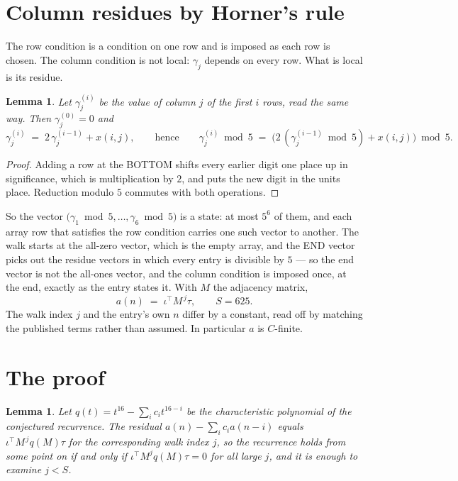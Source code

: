 \documentclass[11pt,a4paper]{article}
\theoremstyle{plain}
\newtheorem{lemma}[theorem]{Lemma}
\theoremstyle{definition}
\begin{document}
\section{Column residues by Horner's rule}

The row condition is a condition on one row and is imposed as each row is chosen. The column
condition is not local: $\gamma_j$ depends on every row. What is local is its residue.

\begin{lemma}\label{lem:horner}
Let $\gamma_j^{(i)}$ be the value of column $j$ of the first $i$ rows, read the same way.
Then $\gamma_j^{(0)}=0$ and
\[
\gamma_j^{(i)}\;=\;2\,\gamma_j^{(i-1)}+x(i,j),
\qquad\text{hence}\qquad
\gamma_j^{(i)}\bmod 5\;=\;
\bigl(2\,(\gamma_j^{(i-1)}\bmod 5)+x(i,j)\bigr)\bmod 5 .
\]
\end{lemma}

\begin{proof}
Adding a row at the BOTTOM shifts every earlier digit one place up in significance, which is
multiplication by $2$, and puts the new digit in the units place. Reduction modulo
$5$ commutes with both operations.
\end{proof}

So the vector $\bigl(\gamma_1\bmod 5,\dots,\gamma_{6}\bmod
5\bigr)$ is a state: at most $5^{6}$ of them, and each array row
that satisfies the row condition carries one such vector to another. The walk starts at the
all-zero vector, which is the empty array, and the END vector picks out the residue vectors in
which every entry is divisible by $5$ --- so the end vector is not the all-ones
vector, and the column condition is imposed once, at the end, exactly as the entry states it.
With $M$ the adjacency matrix,
\[
a(n)\;=\;\iota^{\!\top}M^{\,j}\tau ,\qquad S=625.
\]
The walk index $j$ and the entry's own $n$ differ by a constant, read off by matching the
published terms rather than assumed. In particular $a$ is $C$-finite.

\section{The proof}

\begin{lemma}\label{lem:crit}
Let $q(t)=t^{16}-\sum_i c_it^{16-i}$ be the characteristic polynomial of the
conjectured recurrence. The residual $a(n)-\sum_ic_ia(n-i)$ equals
$\iota^{\!\top}M^{\,j}q(M)\tau$ for the corresponding walk index $j$, so the recurrence
holds from some point on if and only if $\iota^{\!\top}M^{j}q(M)\tau=0$ for all large $j$,
and it is enough to examine $j<S$.
\end{lemma}
\end{document}
